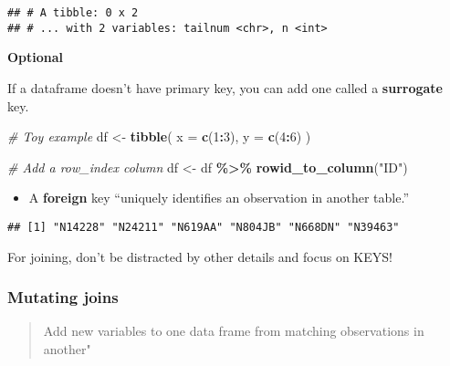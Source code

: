 \documentclass[
]{book}
\newenvironment{Shaded}{\begin{snugshade}}{\end{snugshade}}
\newcommand{\CommentTok}[1]{\textcolor[rgb]{0.56,0.35,0.01}{\textit{#1}}}
\newcommand{\DataTypeTok}[1]{\textcolor[rgb]{0.13,0.29,0.53}{#1}}
\newcommand{\DecValTok}[1]{\textcolor[rgb]{0.00,0.00,0.81}{#1}}
\newcommand{\KeywordTok}[1]{\textcolor[rgb]{0.13,0.29,0.53}{\textbf{#1}}}
\newcommand{\NormalTok}[1]{#1}
\newcommand{\OperatorTok}[1]{\textcolor[rgb]{0.81,0.36,0.00}{\textbf{#1}}}
\newcommand{\StringTok}[1]{\textcolor[rgb]{0.31,0.60,0.02}{#1}}
\providecommand{\tightlist}{%
  \setlength{\itemsep}{0pt}\setlength{\parskip}{0pt}}
\begin{document}
\begin{verbatim}
## # A tibble: 0 x 2
## # ... with 2 variables: tailnum <chr>, n <int>
\end{verbatim}

\textbf{Optional}

If a dataframe doesn't have primary key, you can add one called a \textbf{surrogate} key.

\begin{Shaded}
\begin{Highlighting}[]
\CommentTok{\# Toy example}
\NormalTok{df \textless{}{-}}\StringTok{ }\KeywordTok{tibble}\NormalTok{(}
  \DataTypeTok{x =} \KeywordTok{c}\NormalTok{(}\DecValTok{1}\OperatorTok{:}\DecValTok{3}\NormalTok{),}
  \DataTypeTok{y =} \KeywordTok{c}\NormalTok{(}\DecValTok{4}\OperatorTok{:}\DecValTok{6}\NormalTok{)}
\NormalTok{)}

\CommentTok{\# Add a row\_index column}
\NormalTok{df \textless{}{-}}\StringTok{ }\NormalTok{df }\OperatorTok{\%\textgreater{}\%}\StringTok{ }\KeywordTok{rowid\_to\_column}\NormalTok{(}\StringTok{"ID"}\NormalTok{)}
\end{Highlighting}
\end{Shaded}

\begin{itemize}
\tightlist
\item
  A \textbf{foreign} key ``uniquely identifies an observation in another table.''
\end{itemize}

\begin{Shaded}
\end{Shaded}

\begin{verbatim}
## [1] "N14228" "N24211" "N619AA" "N804JB" "N668DN" "N39463"
\end{verbatim}

For joining, don't be distracted by other details and focus on KEYS!

\hypertarget{mutating-joins}{%
\subsubsection{Mutating joins}\label{mutating-joins}}

\begin{quote}
Add new variables to one data frame from matching observations in another"
\end{quote}
\end{document}
